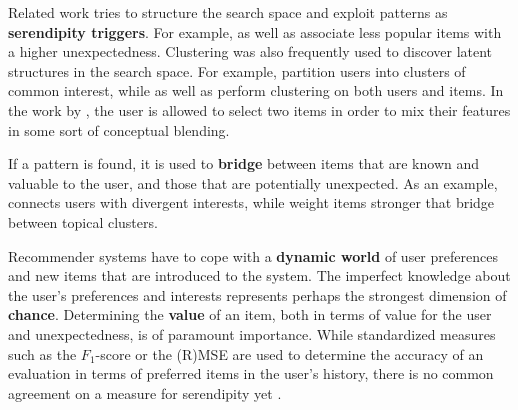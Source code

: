 Related work tries to structure the search space and exploit patterns as \textbf{serendipity triggers}.  For example, \cite{Herlocker2004} as well as \cite{Lu2012} associate less popular items with a higher unexpectedness. Clustering was also frequently used to discover latent structures in the search space. For example, \cite{Kamahara2005} partition users into clusters of common interest, while \cite{Onuma2009} as well as \cite{Zhang2011} perform clustering on both users and items. In the work by \cite{Oku2011}, the user is allowed to select two items in order to mix their features in some sort of conceptual blending. 

If a pattern is found, it is used to \textbf{bridge} between items that are known and valuable to the user, and those that are potentially unexpected.  As an example,  \cite{Sugiyama2011} connects users with divergent interests, while \cite{Onuma2009} weight items stronger that bridge between topical clusters. 

Recommender systems have to cope with a \textbf{dynamic world} of user preferences and new items that are introduced to the system. The imperfect knowledge about the user's preferences and interests represents perhaps the strongest dimension of \textbf{chance}.  Determining the \textbf{value} of an item, both in terms of value for the user and unexpectedness, is of paramount importance. While standardized measures such as the $F_1$-score or the (R)MSE are used to determine the accuracy of an evaluation in terms of preferred items in the user's history, there is no common agreement on a measure for serendipity yet \cite{ Murakami2008, Adamopoulos2011, McCay-Peet2011}.
